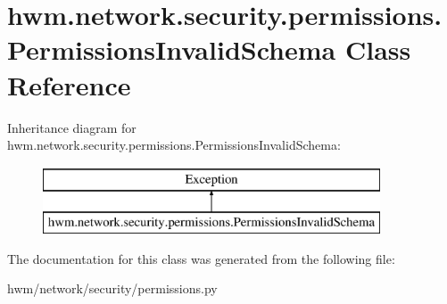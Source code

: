 \hypertarget{classhwm_1_1network_1_1security_1_1permissions_1_1_permissions_invalid_schema}{\section{hwm.\-network.\-security.\-permissions.\-Permissions\-Invalid\-Schema Class Reference}
\label{classhwm_1_1network_1_1security_1_1permissions_1_1_permissions_invalid_schema}
}
Inheritance diagram for hwm.\-network.\-security.\-permissions.\-Permissions\-Invalid\-Schema\-:\begin{figure}[H]
\begin{center}
\leavevmode
\includegraphics[height=2.000000cm]{classhwm_1_1network_1_1security_1_1permissions_1_1_permissions_invalid_schema}
\end{center}
\end{figure}


The documentation for this class was generated from the following file\-:\begin{DoxyCompactItemize}
\item 
hwm/network/security/permissions.\-py\end{DoxyCompactItemize}
